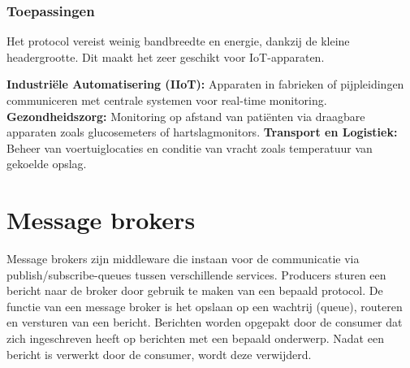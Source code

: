 \subsubsection{Toepassingen}
Het protocol vereist weinig bandbreedte en energie, dankzij de kleine headergrootte. 
Dit maakt het zeer geschikt voor IoT-apparaten.

\textbf{Industriële Automatisering (IIoT):} Apparaten in fabrieken of pijpleidingen communiceren met centrale systemen voor real-time monitoring.
\textbf{Gezondheidszorg:} Monitoring op afstand van patiënten via draagbare apparaten zoals glucosemeters of hartslagmonitors.
\textbf{Transport en Logistiek:} Beheer van voertuiglocaties en conditie van vracht zoals temperatuur van gekoelde opslag.
 
\section{Message brokers}
Message brokers zijn middleware die instaan voor de communicatie via publish/subscribe-queues tussen verschillende services.
Producers sturen een bericht naar de broker door gebruik te maken van een bepaald protocol.
De functie van een message broker is het opslaan op een wachtrij (queue), routeren en versturen van een bericht.
Berichten worden opgepakt door de consumer dat zich ingeschreven heeft op berichten met een bepaald onderwerp.
Nadat een bericht is verwerkt door de consumer, wordt deze verwijderd.

